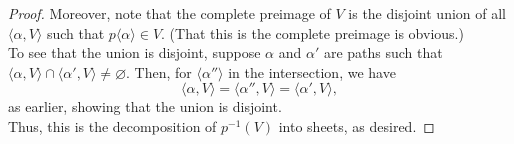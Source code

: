 \documentclass[12pt]{article}
\theoremstyle{definition}
\numberwithin{thm}{section}
\let\emptyset\varnothing
\begin{document}
\begin{proof}
Moreover, note that the complete preimage of $V$ is the disjoint union of all $\langle \alpha, V\rangle$ such that $p\langle \alpha\rangle \in V.$ (That this is the complete preimage is obvious.) \\
To see that the union is disjoint, suppose $\alpha$ and $\alpha'$ are paths such that $\langle \alpha, V\rangle \cap \langle \alpha', V\rangle \neq \emptyset.$ Then, for $\langle \alpha''\rangle$ in the intersection, we have
\begin{equation*} 
	\langle \alpha, V\rangle = \langle \alpha'', V\rangle = \langle \alpha', V\rangle,
\end{equation*} 
as earlier, showing that the union is disjoint.\\
Thus, this is the decomposition of $p^{-1}(V)$ into sheets, as desired.

\dotfill


\end{proof}
\end{document}
